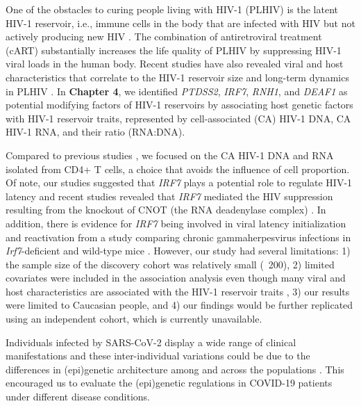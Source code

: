 \documentclass{book}
\begin{document}
\begin{refsection}
One of the obstacles to curing people living with HIV-1 (PLHIV) is the latent HIV-1 reservoir, i.e., immune cells in the body that are infected with HIV but not actively producing new HIV \cite{Pierson2000Reservoirs}.
The combination of antiretroviral treatment (cART) substantially increases the life quality of PLHIV by suppressing HIV-1 viral loads in the human body.
Recent studies have also revealed viral and host characteristics that correlate to the HIV-1 reservoir size and long-term dynamics in PLHIV \cite{Bachmann2019Determinants,Cohn2020The,Buzon2014Long,Wan2020Heritability,Thorball2020Host,Dalmasso2008Distinct}.
In \textbf{Chapter 4}, we identified \textit{PTDSS2}, \textit{IRF7}, \textit{RNH1}, and \textit{DEAF1} as potential modifying factors of HIV-1 reservoirs by associating host genetic factors with HIV-1 reservoir traits, represented by cell-associated (CA) HIV-1 DNA, CA HIV-1 RNA, and their ratio (RNA:DNA).

Compared to previous studies \cite{Thorball2020Host,Dalmasso2008Distinct}, we focused on the CA HIV-1 DNA and RNA isolated from CD4+ T cells, a choice that avoids the influence of cell proportion.
Of note, our studies suggested that \textit{IRF7} plays a potential role to regulate HIV-1 latency and recent studies revealed that \textit{IRF7} mediated the HIV suppression resulting from the knockout of CNOT (the RNA deadenylase complex) \cite{Gordon2020A}.
In addition, there is evidence for \textit{IRF7} being involved in viral latency initialization and reactivation from a study comparing chronic gammaherpesvirus infections in \textit{Irf7}-deficient and wild-type mice \cite{Johnson2020Interferon}.
However, our study had several limitations: 1) the sample size of the discovery cohort was relatively small (~200), 2) limited covariates were included in the association analysis even though many viral and host characteristics are associated with the HIV-1 reservoir traits \cite{Bachmann2019Determinants}, 3) our results were limited to Caucasian people, and 4) our findings would be further replicated using an independent cohort, which is currently unavailable.

Individuals infected by SARS-CoV-2 display a wide range of clinical manifestations \cite{Eythorsson2020Clinical,Guan2020Clinical,Rodriguez2020Clinical,Wu2020Characteristics} and these inter-individual variations could be due to the differences in (epi)genetic architecture among and across the populations \cite{Mercer2021Testing,Niemi2021Mapping,Author2020Genomewide,Pairo2020Genetic,Chlamydas2020Epigenetic}.
This encouraged us to evaluate the (epi)genetic regulations in COVID-19 patients under different disease conditions.


\end{refsection}
\end{document}
